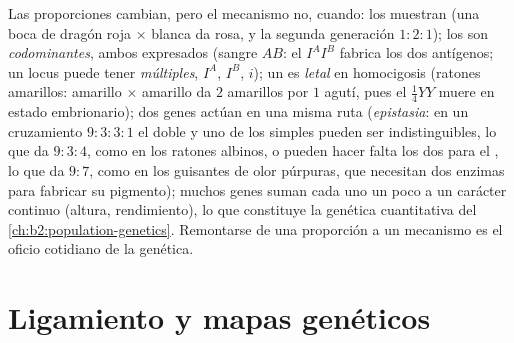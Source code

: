 \begin{proposition}\label{prop:b2:meiosis-heredity:extensions}
Las proporciones cambian, pero el mecanismo no, cuando: los 
muestran \emph{} (una boca de dragón roja $\times$
blanca da rosa, y la segunda generación $1 : 2 : 1$); los  son
\emph{codominantes}, ambos expresados (sangre $AB$: el 
$I^AI^B$ fabrica los dos antígenos; un locus puede tener \emph{
múltiples}, $I^A$, $I^B$, $i$); un  es \emph{letal} en
homocigosis (ratones amarillos: amarillo $\times$ amarillo da $2$
amarillos por
$1$ agutí, pues el $\tfrac14 YY$ muere en estado embrionario); dos genes
actúan en una misma ruta (\emph{epistasia}: en un cruzamiento
$9 : 3 : 3 : 1$ el doble  y uno de los  simples pueden
ser indistinguibles, lo que da
$9 : 3 : 4$, como en los ratones albinos, o pueden hacer falta los dos
 para el , lo que da $9 : 7$, como en los guisantes de
olor púrpuras, que necesitan dos enzimas para fabricar su pigmento);
muchos genes suman cada uno un poco a un carácter continuo (altura,
rendimiento), lo que constituye la genética cuantitativa del
\cref{ch:b2:population-genetics}. Remontarse de una proporción a un
mecanismo es el oficio cotidiano de la genética.
\end{proposition}

\section{Ligamiento y mapas genéticos}

